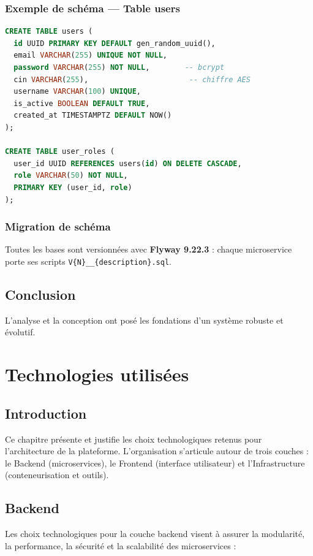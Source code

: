 \documentclass[12pt,a4paper,oneside]{report}
\begin{document}
\subsection{Exemple de schéma --- Table users}
\begin{lstlisting}[language=SQL,caption={Schema de la table users}]
CREATE TABLE users (
  id UUID PRIMARY KEY DEFAULT gen_random_uuid(),
  email VARCHAR(255) UNIQUE NOT NULL,
  password VARCHAR(255) NOT NULL,        -- bcrypt
  cin VARCHAR(255),                       -- chiffre AES
  username VARCHAR(100) UNIQUE,
  is_active BOOLEAN DEFAULT TRUE,
  created_at TIMESTAMPTZ DEFAULT NOW()
);

CREATE TABLE user_roles (
  user_id UUID REFERENCES users(id) ON DELETE CASCADE,
  role VARCHAR(50) NOT NULL,
  PRIMARY KEY (user_id, role)
);
\end{lstlisting}

\subsection{Migration de schéma}
Toutes les bases sont versionnées avec \textbf{Flyway 9.22.3} : chaque microservice porte ses scripts \texttt{V\{N\}\_\_\{description\}.sql}.

\section{Conclusion}
L'analyse et la conception ont posé les fondations d'un système robuste et évolutif.

\chapter{Technologies utilisées}

\section{Introduction}
Ce chapitre présente et justifie les choix technologiques retenus pour l'architecture de la plateforme. L'organisation s'articule autour de trois couches : le Backend (microservices), le Frontend (interface utilisateur) et l'Infrastructure (conteneurisation et outils).

\section{Backend}
Les choix technologiques pour la couche backend visent à assurer la modularité, la performance, la sécurité et la scalabilité des microservices :
\end{document}
